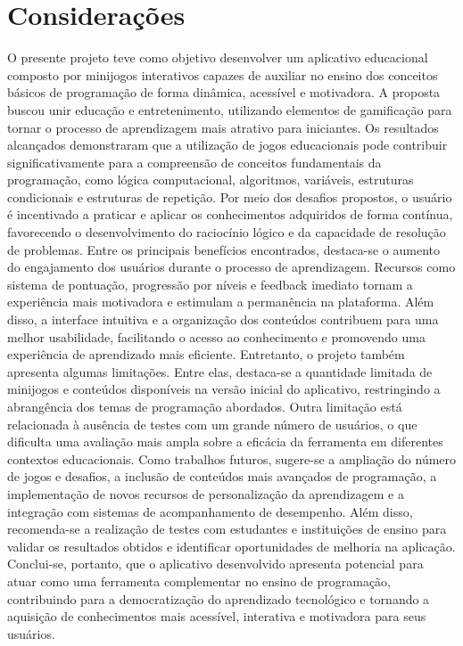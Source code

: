 \documentclass{article}
\begin{document}
\section{Considerações}
O presente projeto teve como objetivo desenvolver um aplicativo educacional composto por minijogos interativos capazes de auxiliar no ensino dos conceitos básicos de programação de forma dinâmica, acessível e motivadora. A proposta buscou unir educação e entretenimento, utilizando elementos de gamificação para tornar o processo de aprendizagem mais atrativo para iniciantes.
Os resultados alcançados demonstraram que a utilização de jogos educacionais pode contribuir significativamente para a compreensão de conceitos fundamentais da programação, como lógica computacional, algoritmos, variáveis, estruturas condicionais e estruturas de repetição. Por meio dos desafios propostos, o usuário é incentivado a praticar e aplicar os conhecimentos adquiridos de forma contínua, favorecendo o desenvolvimento do raciocínio lógico e da capacidade de resolução de problemas.
Entre os principais benefícios encontrados, destaca-se o aumento do engajamento dos usuários durante o processo de aprendizagem. Recursos como sistema de pontuação, progressão por níveis e feedback imediato tornam a experiência mais motivadora e estimulam a permanência na plataforma. Além disso, a interface intuitiva e a organização dos conteúdos contribuem para uma melhor usabilidade, facilitando o acesso ao conhecimento e promovendo uma experiência de aprendizado mais eficiente.
Entretanto, o projeto também apresenta algumas limitações. Entre elas, destaca-se a quantidade limitada de minijogos e conteúdos disponíveis na versão inicial do aplicativo, restringindo a abrangência dos temas de programação abordados. Outra limitação está relacionada à ausência de testes com um grande número de usuários, o que dificulta uma avaliação mais ampla sobre a eficácia da ferramenta em diferentes contextos educacionais.
Como trabalhos futuros, sugere-se a ampliação do número de jogos e desafios, a inclusão de conteúdos mais avançados de programação, a implementação de novos recursos de personalização da aprendizagem e a integração com sistemas de acompanhamento de desempenho. Além disso, recomenda-se a realização de testes com estudantes e instituições de ensino para validar os resultados obtidos e identificar oportunidades de melhoria na aplicação.
Conclui-se, portanto, que o aplicativo desenvolvido apresenta potencial para atuar como uma ferramenta complementar no ensino de programação, contribuindo para a democratização do aprendizado tecnológico e tornando a aquisição de conhecimentos mais acessível, interativa e motivadora para seus usuários.
\end{document}
